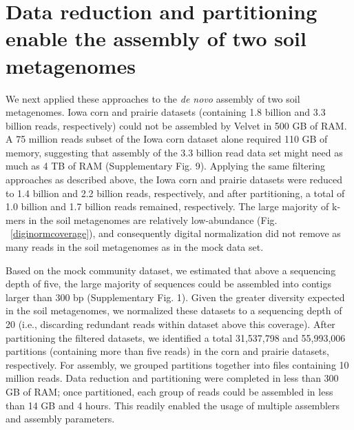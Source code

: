 \documentclass{nature}%
\begin{document}
\section*{Data reduction and partitioning enable the assembly of two soil metagenomes}

We next applied these approaches to the {\em de novo} assembly of two
soil metagenomes.  Iowa corn and prairie datasets (containing 1.8
billion and 3.3 billion reads, respectively) could not be assembled by
Velvet in 500 GB of RAM.  A 75 million reads subset of the Iowa corn
dataset alone required 110 GB of memory, suggesting that assembly of
the 3.3 billion read data set might need as much as 4 TB of RAM
(Supplementary Fig. 9).  Applying the same filtering approaches as described
above, the Iowa corn and prairie datasets were reduced to 1.4 billion
and 2.2 billion reads, respectively, and after partitioning, a total
of 1.0 billion and 1.7 billion reads remained, respectively.  The
large majority of k-mers in the soil metagenomes are relatively
low-abundance (Fig. ~\ref{diginormcoverage}), and consequently digital
normalization did not remove as many reads in the soil metagenomes as
in the mock data set.

Based on the mock community dataset, we estimated that above a
sequencing depth of five, the large majority of sequences could be
assembled into contigs larger than 300 bp (Supplementary Fig. 1).  Given the
greater diversity expected in the soil metagenomes, we normalized
these datasets to a sequencing depth of 20 (i.e., discarding redundant 
reads within dataset above this coverage).  
After partitioning the filtered datasets, we identified a total
31,537,798 and 55,993,006 partitions (containing more than five reads)
in the corn and prairie datasets, respectively.  For assembly, we
grouped partitions together into files containing 10 million reads.
Data reduction and partitioning were completed in less than 300 GB of
RAM; once partitioned, each group of reads could be assembled in less
than 14 GB and 4 hours.  This readily enabled the usage of multiple
assemblers and assembly parameters.
\end{document}
